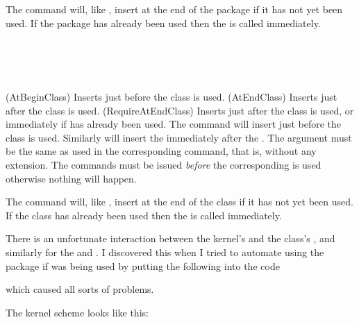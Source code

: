     The \cmd{\RequireAtEndPackage} command will, 
like \cmd{\AtEndPackage}, insert  
at the end of the  package if it has not yet been used.
If the package has already been used then the  is 
called immediately.


\begin{syntax}
\cmd{\AtBeginClass} \\
\cmd{\AtEndClass} \\
\cmd{\RequireAtEndClass} \\
\end{syntax}
\glossary(AtBeginClass)%
  {}%
  {Inserts  just before the  class is used.}%
\glossary(AtEndClass)%
  {}%
  {Inserts  just after the  class is used.}%
\glossary(RequireAtEndClass)%
  {}%
  {Inserts  just after the  class is used,
  or immediately if  has already been used.}%
The \cmd{\AtBeginClass} command will insert  just before the 
 class is used. Similarly
\cmd{\AtEndClass} will insert the  immediately after the 
. The  argument must be the same as used in the
corresponding \cmd{\LoadClass} command, that is, without any 
extension. The  commands 
must be issued \emph{before} the corresponding  is used
otherwise nothing will happen.

    The \cmd{\RequireAtEndClass} command will, 
like \cmd{\AtEndClass}, insert  
at the end of the  class if it has not yet been used.
If the class has already been used then the  is 
called immediately.

    There is an unfortunate interaction between the kernel's 
\cmd{\AtEndOfPackage} and the class's \cmd{\AtEndPackage}, and similarly
for the \cmd{\AtEndOfClass} and \cmd{\AtEndClass}. I discovered this when
I tried to automate using the  package if 
was being used by putting the following into the  code
\begin{lcode}
\end{lcode}
which caused all sorts of problems.

    The kernel scheme looks like this:
\begin{lcode}
\newcommand{\usepackage}[1]{%
  ...
  \InputIfFileExists{#1}
<AtEndOfPackage code>}
\end{lcode}

